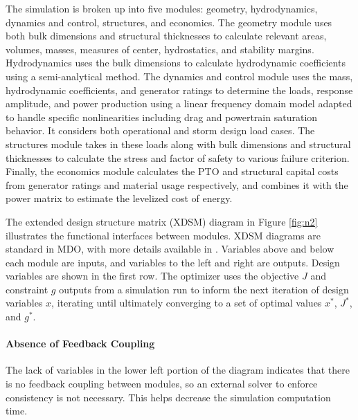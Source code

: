 The simulation is broken up into five modules: geometry, hydrodynamics, dynamics and control, structures, and economics.
The geometry module uses both bulk dimensions and structural thicknesses to calculate relevant areas, volumes, masses, measures of center, hydrostatics, and stability margins.
Hydrodynamics uses the bulk dimensions to calculate hydrodynamic coefficients using a semi-analytical method.
The dynamics and control module uses the mass, hydrodynamic coefficients, and generator ratings to determine the loads, response amplitude, and power production using a linear frequency domain model adapted to handle specific nonlinearities including drag and powertrain saturation behavior.
It considers both operational and storm design load cases.
The structures module takes in these loads along with bulk dimensions and structural thicknesses to calculate the stress and factor of safety to various failure criterion.
Finally, the economics module calculates the PTO and structural capital costs from generator ratings and material usage respectively, and combines it with the power matrix to estimate the levelized cost of energy.

The extended design structure matrix (XDSM) diagram in Figure \ref{fig:n2} illustrates the functional interfaces between modules.
XDSM diagrams are standard in MDO, with more details available in \cite{lambe_extensions_2012}.
Variables above and below each module are inputs, and variables to the left and right are outputs.
Design variables are shown in the first row.
The optimizer uses the objective $J$ and constraint $g$ outputs from a simulation run to inform the next iteration of design variables $x$, iterating until ultimately converging to a set of optimal values $x^*$, $J^*$, and $g^*$.

\paragraph{Absence of Feedback Coupling}
The lack of variables in the lower left portion of the diagram indicates that there is no feedback coupling between modules, so an external solver to enforce consistency is not necessary.
This helps decrease the simulation computation time.
